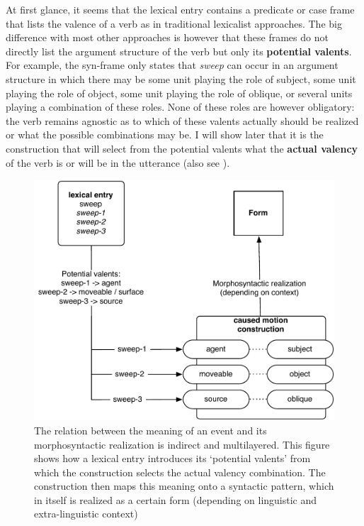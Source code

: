 At first glance, it seems that the lexical entry contains a predicate or case frame that lists the valence of a verb as in traditional lexicalist approaches. The big difference with most other approaches is however that these frames do not directly list the argument structure of the verb but only its {\bfseries potential valents}. For example, the syn-frame only states that {\em sweep} can occur in an argument structure in which there may be some unit playing the role of subject, some unit playing the role of object, some unit playing the role of oblique, or several units playing a combination of these roles. None of these roles are however obligatory: the verb remains agnostic as to which of these valents actually should be realized or what the possible combinations may be. I will show later that it is the construction that will select from the potential valents what the {\bfseries actual valency} of the verb is or will be in the utterance (also see ).

\begin{figure}[t]
\centerline{\includegraphics[width=0.8\linewidth]{Chapter2/figs/quadrant}}
 \caption[Integrating {\em sweep} with the Caused-Motion Construction]{The relation between the meaning of an event and its morphosyntactic realization is indirect and multilayered. This figure shows how a lexical entry introduces its `potential valents' from which the construction selects the actual valency combination. The construction then maps this meaning onto a syntactic pattern, which in itself is realized as a certain form (depending on linguistic and extra-linguistic context)}
   \label{f:sweep-quadrant}
\end{figure}

